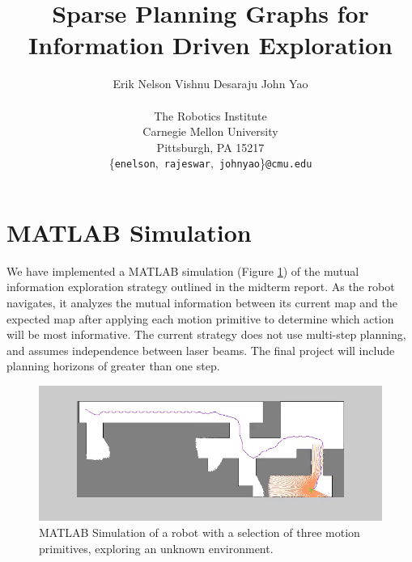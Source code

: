 \documentclass{article}
\begin{document}
\title{Sparse Planning Graphs for \\ Information Driven Exploration}


\date{}

\author{
  Erik Nelson \qquad Vishnu Desaraju \qquad John Yao \\
  \\
  \small The Robotics Institute \\
  \small Carnegie Mellon University \\
  \small Pittsburgh, PA 15217 \\
\small \{\texttt{enelson},\ \texttt{rajeswar},\ \texttt{johnyao}\}\texttt{@cmu.edu}}

\maketitle


\section{MATLAB Simulation}
We have implemented a MATLAB simulation (Figure \ref{fig:whiskerbotstart}) of the mutual information exploration strategy outlined in the midterm report. As the robot navigates, it analyzes the mutual information between its current map and the expected map after applying each motion primitive to determine which action will be most informative. The current strategy does not use multi-step planning, and assumes independence between laser beams. The final project will include planning horizons of greater than one step.

\begin{figure}[!htbp]
\centering
\includegraphics[width=4.5in]{whiskerbotstart.png}
\caption{MATLAB Simulation of a robot with a selection of three motion primitives, exploring an unknown environment.}
\label{fig:whiskerbotstart}
\end{figure}
\end{document}
